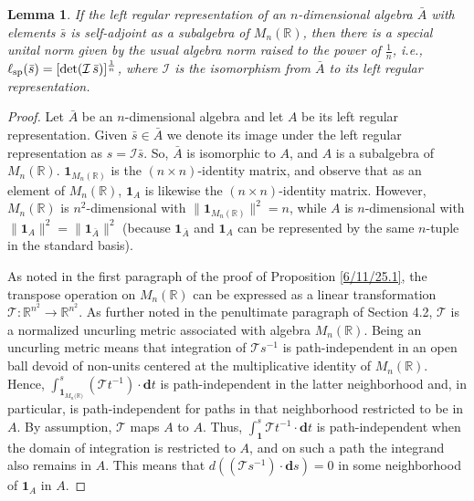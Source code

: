 \documentclass{amsart}
\newtheorem{lemma}[theorem]{Lemma}
\theoremstyle{definition}
\numberwithin{theorem}{section}
\numberwithin{equation}{section}
\begin{document}
 
  \begin{lemma}\label{5/13/22.1} If the left regular representation of an $n$-dimensional algebra $\bar{A}$ with elements $\bar{s}$ is self-adjoint as a subalgebra of $M_n(\mathbb{R})$, then there is a special unital norm given by the usual algebra norm raised to the power of $\frac{1}{n}$, i.e., $\ell_{\rm sp}(\bar{s}) = [{\rm det}(\mathcal{I}\, \bar{s})]^\frac{1}{n}$, where $\mathcal{I}$ is the isomorphism from $\bar{A}$ to its left regular representation.
\end{lemma}

\begin{proof} 
Let $\bar{A}$ be an $n$-dimensional algebra and let $A$ be its left regular representation.  Given $\bar{s}\in\bar{A}$ we denote its image under the left regular representation as $s = \mathcal{I}\bar{s}$.
 So, $\bar{A}$ is isomorphic to $A$, and $A$ is a subalgebra of $ M_n(\mathbb{R})$.   $\mathbf{1}_{M_n(\mathbb{R})}$ is the $(n\times n)$-identity matrix, and observe that as an element of $ M_n(\mathbb{R})$, $\mathbf{1}_A$ is likewise the $(n\times n)$-identity matrix.  However, $ M_n(\mathbb{R})$ is $n^2$-dimensional with $\|\mathbf{1}_{M_n(\mathbb{R})}\|^2 = n$, while $A$ is $n$-dimensional with $\|\mathbf{1}_A\|^2 = \|\mathbf{1}_{\bar{A}}\|^2$ (because $\mathbf{1}_{\bar{A}}$ and  $\mathbf{1}_A$ can be represented by the same $n$-tuple in the standard basis).   

As noted in the first paragraph of the proof of Proposition \ref{6/11/25.1}, the transpose operation on $ M_n(\mathbb{R})$ can be expressed as a linear transformation $\mathcal{\mathcal{T}}:\mathbb{R}^{n^2}\rightarrow \mathbb{R}^{n^2}$.  As further noted in the penultimate paragraph of Section 4.2, $\mathcal{T}$ is a normalized uncurling metric associated with algebra  $ M_n(\mathbb{R})$.  Being an uncurling metric means that integration of $\mathcal{\mathcal{T}}s^{-1}$ is path-independent in an open ball devoid of non-units centered at the multiplicative identity of $ M_n(\mathbb{R})$.  
 Hence, $\int_{\mathbf{1}_{M_n({\mathbb{R})}}}^s (\mathcal{\mathcal{T}}t^{-1})\cdot \mathbf{d}t$ is path-independent in the latter neighborhood and, in particular, is path-independent for paths in that neighborhood restricted to be in $A$.  By assumption, $\mathcal{\mathcal{T}}$ maps $A$ to $A$. 
 Thus, $\int_\mathbf{1}^s \mathcal{\mathcal{T}}t^{-1}\cdot \mathbf{d}t$ is path-independent when the domain of integration is restricted to $A$, and on such a path the integrand also remains in $A$.  This means that 
  $d((\mathcal{\mathcal{T}}s^{-1})\cdot \mathbf{d}s) = 0$ in some neighborhood of $\mathbf{1}_A$ in $A$.
  

\end{proof}
\end{document}
